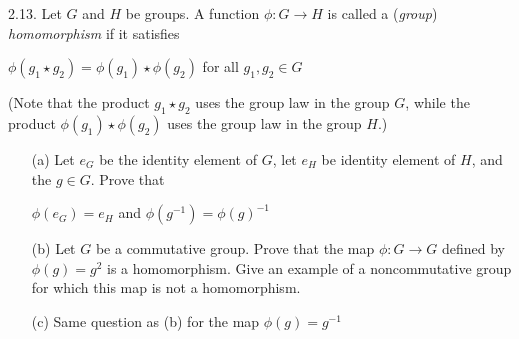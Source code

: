2.13. Let $G$ and $H$ be groups. A function $\phi: G \rightarrow H$ is called a (\textit{group}) \textit{homomorphism} if it satisfies

\begin{center}
    $\phi(g_1 \star g_2) = \phi(g_1) \star \phi(g_2)$ for all $g_1, g_2 \in G$
\end{center}

(Note that the product $g_1 \star g_2$ uses the group law in the group $G$, while the product $\phi(g_1) \star \phi(g_2)$ uses the group law in the group $H$.)

\begin{enumerate}
    \item [(a)] Let $e_G$ be the identity element of $G$, let $e_H$ be identity element of $H$, and the $g \in G$. Prove that
    \begin{center}
        $\phi(e_G) = e_H$ \quad\quad and \quad\quad $\phi(g^{-1}) = \phi(g)^{-1}$
    \end{center}
    \item [(b)] Let $G$ be a commutative group. Prove that the map $\phi: G \rightarrow G$ defined by $\phi(g)=g^2$ is a homomorphism. Give an example of a noncommutative group for which this map is not a homomorphism.
    \item [(c)] Same question as (b) for the map $\phi(g)=g^{-1}$
\end{enumerate}

